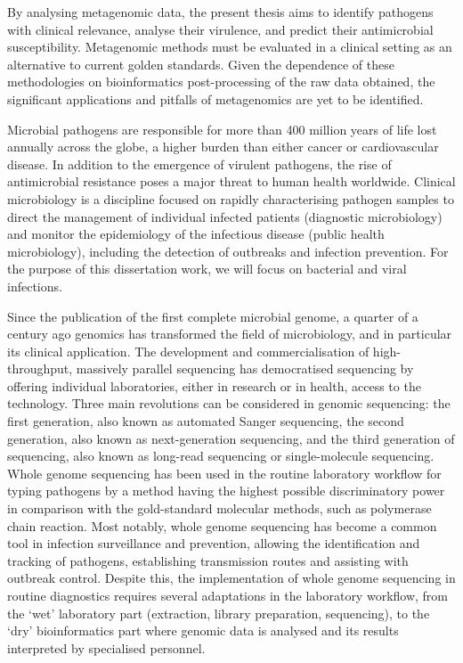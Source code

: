 By analysing metagenomic data, the present thesis aims to identify pathogens with clinical relevance, analyse their virulence, and predict their antimicrobial susceptibility. Metagenomic methods must be evaluated in a clinical setting as an alternative to current golden standards. Given the dependence of these methodologies on bioinformatics post-processing of the raw data obtained, the significant applications and pitfalls of metagenomics are yet to be identified.

Microbial pathogens are responsible for more than 400 million years of life lost annually across the globe, a higher burden than either cancer or cardiovascular disease. In addition to the emergence of virulent pathogens, the rise of antimicrobial resistance poses a major threat to human health worldwide. Clinical microbiology is a discipline focused on rapidly characterising pathogen samples to direct the management of individual infected patients (diagnostic microbiology) and monitor the epidemiology of the infectious disease (public health microbiology), including the detection of outbreaks and infection prevention. For the purpose of this dissertation work, we will focus on bacterial and viral infections.

Since the publication of the first complete microbial genome, a quarter of a century ago genomics has transformed the field of microbiology, and in particular its clinical application. The development and commercialisation of high-throughput, massively parallel sequencing has democratised sequencing by offering individual laboratories, either in research or in health, access to the technology. Three main revolutions can be considered in
genomic sequencing: the first generation, also known as automated Sanger sequencing, the second generation, also known as next-generation sequencing, and the third generation of sequencing, also known as long-read sequencing or single-molecule sequencing. Whole genome sequencing has been used in the routine laboratory workflow for typing pathogens by a method having the highest possible discriminatory power in comparison with the gold-standard molecular methods, such as polymerase chain reaction. Most notably, whole genome sequencing has become a common tool in infection surveillance and prevention, allowing the identification and tracking of pathogens, establishing transmission routes and assisting with outbreak control. Despite this, the implementation of whole genome sequencing in routine diagnostics requires several adaptations in the laboratory workflow, from the ‘wet’ laboratory part (extraction, library preparation, sequencing), to the ‘dry’ bioinformatics part where genomic data is analysed and its results interpreted by specialised personnel. 

